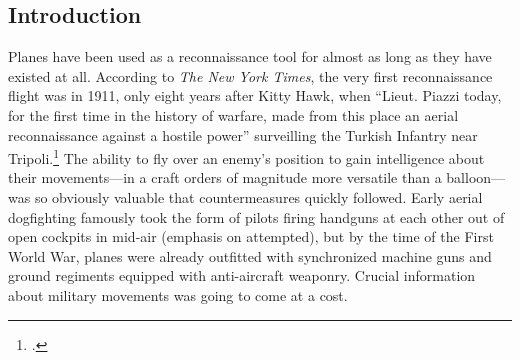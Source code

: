 \documentclass{report}
\begin{document}
\begin{refsegment}




\section{Introduction}
Planes have been used as a reconnaissance tool for almost as long as they have existed at all. According to \emph{The New York Times}, the very first reconnaissance flight was in 1911, only eight years after Kitty Hawk, when ``Lieut. Piazzi today, for the first time in the history of warfare, made from this place an aerial reconnaissance against a hostile power'' surveilling the Turkish Infantry near Tripoli.\footcite{special_cable_to_the_new_york_times_air_1911} The ability to fly over an enemy's position to gain intelligence about their movements---in a craft orders of magnitude more versatile than a balloon---was so obviously valuable that countermeasures quickly followed. Early aerial dogfighting famously took the form of pilots firing handguns at each other out of open cockpits in mid-air (emphasis on attempted), but by the time of the First World War, planes were already outfitted with synchronized machine guns and ground regiments equipped with anti-aircraft weaponry. Crucial information about military movements was going to come at a cost.


\end{refsegment}
\end{document}
